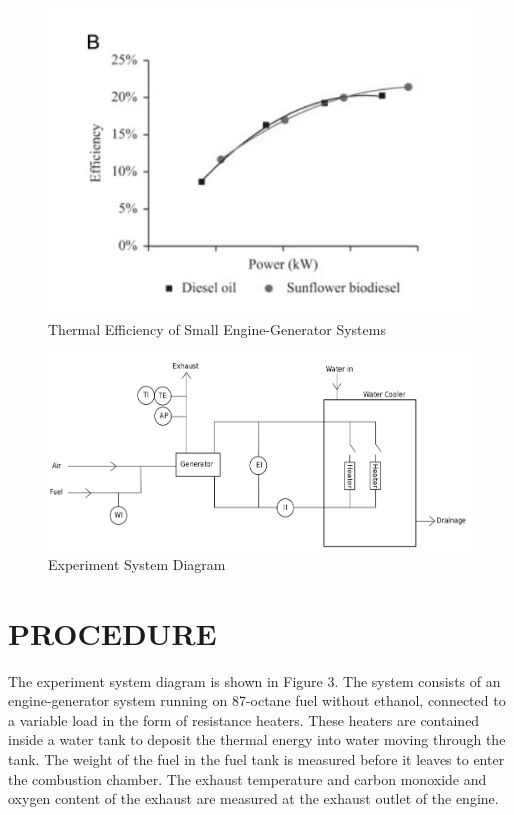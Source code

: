 \documentclass[12pt]{article}
\begin{document}
\begin{figure}[h!] %
   \centering
   \includegraphics[width=5in]{thermal_efficiency_reference.jpg} 
   \caption{Thermal Efficiency of Small Engine-Generator Systems}
   \label{fig:example}
\end{figure}


\newpage


\begin{figure}[h!] %
   \centering
   \includegraphics[width=\linewidth]{system_diagram.png} 
   \caption{Experiment System Diagram}
   \label{fig:example}
\end{figure}

\section*{\fontsize{12}{12}\selectfont PROCEDURE}
The experiment system diagram is shown in Figure 3. The system consists of an engine-generator system running on 87-octane fuel without ethanol, connected to a variable load in the form of resistance heaters. These heaters are contained inside a water tank to deposit the thermal energy into water moving through the tank. The weight of the fuel in the fuel tank is measured before it leaves to enter the combustion chamber. The exhaust temperature and carbon monoxide and oxygen content of the exhaust are measured at the exhaust outlet of the engine.
\bigskip
\end{document}
